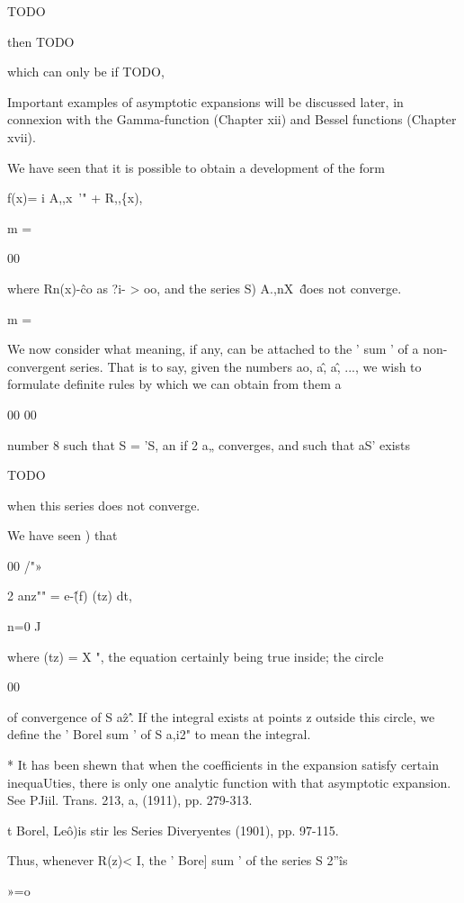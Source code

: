 TODO

then TODO

which can only be if TODO,

Important examples of asymptotic expansions will be discussed later,
in connexion with the Gamma-function (Chapter xii) and Bessel
functions (Chapter xvii).


We have seen that it is possible to obtain a development of the form

f(x)= i A,,x~'" + R,,\{x),

m =

00

where Rn(x)-\^ co as ?i- > oo, and the series S) A.,nX~\^ does not
converge.

m =

We now consider what meaning, if any, can be attached to the ' sum '
of a non- convergent series. That is to say, given the numbers ao,
a\^, a\^, ..., we wish to formulate definite rules by which we can
obtain from them a

00 00

number 8 such that S = 'S, an if 2 a„ converges, and such that aS'
exists

TODO

when this series does not converge.

 We have seen ) that

00 /"»

2 anz"" = e-\^(f) (tz) dt,

n=0 J

where (tz) = X ", the equation certainly being true inside; the
circle

00

of convergence of S a\^z'\^. If the integral exists at points z
outside this circle, we define the ' Borel sum ' of S a,i2" to mean
the integral.

* It has been shewn that when the coefficients in the expansion
satisfy certain inequaUties, there is only one analytic function with
that asymptotic expansion. See PJiil. Trans. 213, a, (1911), pp.
279-313.

t Borel, Le\^o)is stir les Series Diveryentes (1901), pp. 97-115.

% 
% 

Thus, whenever R(z)< I, the ' Bore] sum ' of the series S 2''\^ is

»=o

